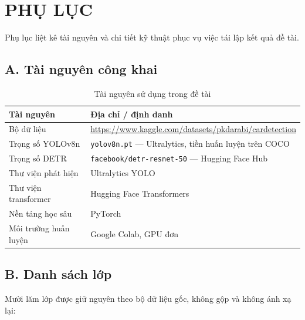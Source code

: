 \chapter*{PHỤ LỤC}

Phụ lục liệt kê tài nguyên và chi tiết kỹ thuật phục vụ việc tái lập kết quả đề tài.

\section*{A. Tài nguyên công khai}

\begin{table}[H]
\centering
\caption{Tài nguyên sử dụng trong đề tài}
\label{tab:tainguyen}
\small
\begin{tabular}{p{4.0cm} p{9.5cm}}
\toprule
\textbf{Tài nguyên} & \textbf{Địa chỉ / định danh} \\
\midrule
Bộ dữ liệu & \url{https://www.kaggle.com/datasets/pkdarabi/cardetection} \\
Trọng số YOLOv8n & \texttt{yolov8n.pt} --- Ultralytics, tiền huấn luyện trên COCO \\
Trọng số DETR & \texttt{facebook/detr-resnet-50} --- Hugging Face Hub \\
Thư viện phát hiện & Ultralytics YOLO \cite{jocher2023ultralytics} \\
Thư viện transformer & Hugging Face Transformers \cite{wolf2020transformers} \\
Nền tảng học sâu & PyTorch \cite{paszke2019pytorch} \\
Môi trường huấn luyện & Google Colab, GPU đơn \\
\bottomrule
\end{tabular}
\end{table}

\section*{B. Danh sách lớp}

Mười lăm lớp được giữ nguyên theo bộ dữ liệu gốc, không gộp và không ánh xạ lại:

